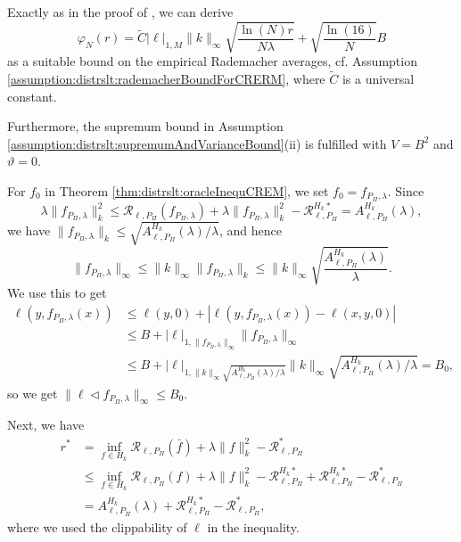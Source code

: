 \documentclass[letterpaper]{article} %
\newcommand{\risk}{\mathcal{R}} %
\newcommand{\Risk}[2]{\risk_{{#1},{#2}}} %
\newcommand{\RiskBayes}[2]{\risk_{{#1},{#2}}^\ast} %
\newcommand{\LocLip}[2]{|#1|_{1,{#2}}} %
\newcommand{\hilbertianEmbed}{\Pi} %
\newcommand{\pipe}{\lhd}
\newcommand{\ApproxErrorFunc}[3]{A^{#3}_{#1,#2}}
\newcommand{\Aef}{\ApproxErrorFunc{\ell}{P_\hilbertianEmbed}{H_k}}
\newcommand{\RiskOpt}[3]{\Risk{#1}{#2}^{#3\ast}}
\newcommand{\clipped}[1]{\bar{#1}}
\begin{document}
Exactly as in the proof of \cite[Theorem~7.22]{SC08}, we can derive
\begin{equation*}
    \varphi_N(r) = \tilde C \LocLip{\ell}{M}\|k\|_\infty \sqrt{\frac{\ln(N)r}{N\lambda}} + \sqrt{\frac{\ln(16)}{N}}B
\end{equation*}
as a suitable bound on the empirical Rademacher averages, cf. Assumption \ref{assumption:distrslt:rademacherBoundForCRERM}, where $\tilde C$ is a universal constant.

Furthermore, the supremum bound in Assumption \ref{assumption:distrslt:supremumAndVarianceBound}(ii) is fulfilled with $V=B^2$ and $\vartheta=0$.

For $f_0$ in Theorem \ref{thm:distrslt:oracleInequCREM}, we set $f_0=f_{P_\hilbertianEmbed,\lambda}$.
Since
\begin{equation*}
    \lambda \|f_{P_\hilbertianEmbed,\lambda}\|_k^2 
    \leq
    \Risk{\ell}{P_\hilbertianEmbed}(f_{P_\hilbertianEmbed,\lambda}) +  \lambda \|f_{P_\hilbertianEmbed,\lambda}\|_k^2 - \RiskOpt{\ell}{P_\hilbertianEmbed}{H_k}
    = \Aef(\lambda),
\end{equation*}
we have $ \|f_{P_\hilbertianEmbed,\lambda}\|_k \leq \sqrt{\Aef(\lambda)/\lambda}$, and hence
\begin{equation*}
    \| f_{P_\hilbertianEmbed,\lambda}\|_\infty \leq \|k\|_\infty  \|f_{P_\hilbertianEmbed,\lambda}\|_k
    \leq \|k\|_\infty \sqrt{\frac{\Aef(\lambda)}{\lambda}}.
\end{equation*}
We use this to get
\begin{align*}
    \ell(y,f_{P_\hilbertianEmbed,\lambda}(x)) & \leq \ell(y,0) + |\ell(y,f_{P_\hilbertianEmbed,\lambda}(x)) - \ell(x,y,0)| \\
    & \leq B + \LocLip{\ell}{\|f_{P_\hilbertianEmbed,\lambda}\|_\infty} \|f_{P_\hilbertianEmbed,\lambda}\|_\infty \\
    & \leq B + \LocLip{\ell}{\|k\|_\infty\sqrt{\Aef(\lambda)/\lambda}}\|k\|_\infty\sqrt{\Aef(\lambda)/\lambda} = B_0,
\end{align*}
so we get $\|\ell \pipe f_{P_\hilbertianEmbed,\lambda}\|_\infty \leq B_0$.

Next, we have
\begin{align*}
    r^\ast & = \inf_{f \in H_k} \Risk{\ell}{P_\hilbertianEmbed}(\clipped{f}) + \lambda \|f\|_k^2 - \RiskBayes{\ell}{P_\hilbertianEmbed} \\
    & \leq \inf_{f \in H_k} \Risk{\ell}{P_\hilbertianEmbed}(f) + \lambda \|f\|_k^2 - \RiskOpt{\ell}{P_\hilbertianEmbed}{H_k}
        +  \RiskOpt{\ell}{P_\hilbertianEmbed}{H_k} - \RiskBayes{\ell}{P_\hilbertianEmbed} \\
    & = \Aef(\lambda) + \RiskOpt{\ell}{P_\hilbertianEmbed}{H_k} - \RiskBayes{\ell}{P_\hilbertianEmbed},
\end{align*}
where we used the clippability of $\ell$ in the inequality.
\end{document}
